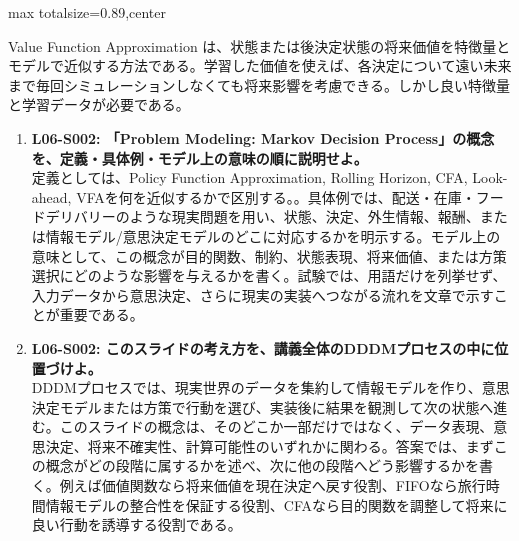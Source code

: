 \begin{minipage}[t]{0.58\textwidth}
\begin{adjustbox}{max totalsize={\textwidth}{0.89\textheight},center}
\begin{minipage}{\textwidth}
Value Function Approximation は、状態または後決定状態の将来価値を特徴量とモデルで近似する方法である。学習した価値を使えば、各決定について遠い未来まで毎回シミュレーションしなくても将来影響を考慮できる。しかし良い特徴量と学習データが必要である。\par{}\begin{enumerate}\item \textbf{L06-S002: 「Problem Modeling: Markov Decision Process」の概念を、定義・具体例・モデル上の意味の順に説明せよ。}\\定義としては、Policy Function Approximation, Rolling Horizon, CFA, Look-ahead, VFAを何を近似するかで区別する。。具体例では、配送・在庫・フードデリバリーのような現実問題を用い、状態、決定、外生情報、報酬、または情報モデル/意思決定モデルのどこに対応するかを明示する。モデル上の意味として、この概念が目的関数、制約、状態表現、将来価値、または方策選択にどのような影響を与えるかを書く。試験では、用語だけを列挙せず、入力データから意思決定、さらに現実の実装へつながる流れを文章で示すことが重要である。\item \textbf{L06-S002: このスライドの考え方を、講義全体のDDDMプロセスの中に位置づけよ。}\\DDDMプロセスでは、現実世界のデータを集約して情報モデルを作り、意思決定モデルまたは方策で行動を選び、実装後に結果を観測して次の状態へ進む。このスライドの概念は、そのどこか一部だけではなく、データ表現、意思決定、将来不確実性、計算可能性のいずれかに関わる。答案では、まずこの概念がどの段階に属するかを述べ、次に他の段階へどう影響するかを書く。例えば価値関数なら将来価値を現在決定へ戻す役割、FIFOなら旅行時間情報モデルの整合性を保証する役割、CFAなら目的関数を調整して将来に良い行動を誘導する役割である。\end{enumerate}
\end{minipage}
\end{adjustbox}
\end{minipage}


